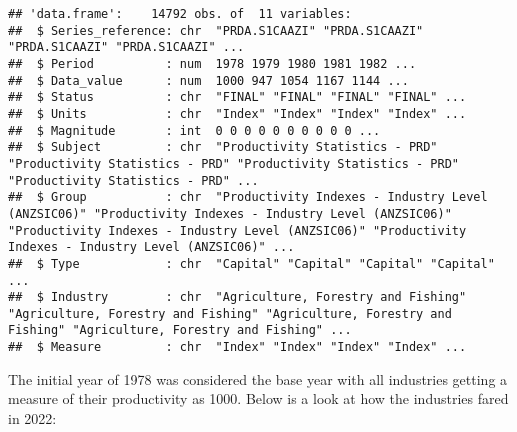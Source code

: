 \documentclass[
]{article}
\newenvironment{Shaded}{\begin{snugshade}}{\end{snugshade}}
\newcommand{\AttributeTok}[1]{\textcolor[rgb]{0.13,0.29,0.53}{#1}}
\newcommand{\CommentTok}[1]{\textcolor[rgb]{0.56,0.35,0.01}{\textit{#1}}}
\newcommand{\FunctionTok}[1]{\textcolor[rgb]{0.13,0.29,0.53}{\textbf{#1}}}
\newcommand{\NormalTok}[1]{#1}
\newcommand{\OtherTok}[1]{\textcolor[rgb]{0.56,0.35,0.01}{#1}}
\newcommand{\SpecialCharTok}[1]{\textcolor[rgb]{0.81,0.36,0.00}{\textbf{#1}}}
\newcommand{\StringTok}[1]{\textcolor[rgb]{0.31,0.60,0.02}{#1}}
\begin{document}
\begin{verbatim}
## 'data.frame':    14792 obs. of  11 variables:
##  $ Series_reference: chr  "PRDA.S1CAAZI" "PRDA.S1CAAZI" "PRDA.S1CAAZI" "PRDA.S1CAAZI" ...
##  $ Period          : num  1978 1979 1980 1981 1982 ...
##  $ Data_value      : num  1000 947 1054 1167 1144 ...
##  $ Status          : chr  "FINAL" "FINAL" "FINAL" "FINAL" ...
##  $ Units           : chr  "Index" "Index" "Index" "Index" ...
##  $ Magnitude       : int  0 0 0 0 0 0 0 0 0 0 ...
##  $ Subject         : chr  "Productivity Statistics - PRD" "Productivity Statistics - PRD" "Productivity Statistics - PRD" "Productivity Statistics - PRD" ...
##  $ Group           : chr  "Productivity Indexes - Industry Level (ANZSIC06)" "Productivity Indexes - Industry Level (ANZSIC06)" "Productivity Indexes - Industry Level (ANZSIC06)" "Productivity Indexes - Industry Level (ANZSIC06)" ...
##  $ Type            : chr  "Capital" "Capital" "Capital" "Capital" ...
##  $ Industry        : chr  "Agriculture, Forestry and Fishing" "Agriculture, Forestry and Fishing" "Agriculture, Forestry and Fishing" "Agriculture, Forestry and Fishing" ...
##  $ Measure         : chr  "Index" "Index" "Index" "Index" ...
\end{verbatim}

The initial year of 1978 was considered the base year with all
industries getting a measure of their productivity as 1000. Below is a
look at how the industries fared in 2022:

\begin{Shaded}
\end{Shaded}
\end{document}
